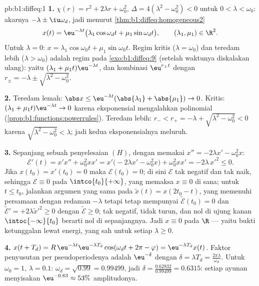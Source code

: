 \begin{solution}{pb:b1:diffeq:1}
\textbf{1.} $\chi(r) = r^2 + 2\lambda r + \omega_0^2$, $\Delta =
4(\lambda^2 - \omega_0^2) < 0$ untuk $0 < \lambda < \omega_0$: akarnya
$-\lambda \pm \iu\omega_d$, jadi menurut
\cref{thm:b1:diffeq:homogeneous2}
\[
x(t) = \eu^{-\lambda t}\bigl(\lambda_1\cos\omega_d t +
\mu_1\sin\omega_d t\bigr), \qquad (\lambda_1, \mu_1) \in \R^2 .
\]
Untuk $\lambda = 0$: $x = \lambda_1\cos\omega_0 t +
\mu_1\sin\omega_0 t$. Regim kritis ($\lambda = \omega_0$) dan
teredam lebih ($\lambda > \omega_0$) adalah regim pada
\cref{exo:b1:diffeq:9} (setelah waktunya diskalakan ulang): yaitu $(\lambda_1 +
\mu_1 t)\eu^{-\lambda t}$, dan kombinasi $\eu^{r_\pm t}$
dengan $r_\pm = -\lambda \pm \sqrt{\lambda^2 - \omega_0^2}$.

\textbf{2.} Teredam lemah: $\abs x \leq \eu^{-\lambda
t}(\abs{\lambda_1} + \abs{\mu_1}) \to 0$. Kritis: $(\lambda_1 +
\mu_1 t)\eu^{-\lambda t} \to 0$ karena eksponensial mengalahkan
polinomial (\cref{prop:b1:functions:powerrules}). Teredam lebih:
$r_- < r_+ = -\lambda + \sqrt{\lambda^2 - \omega_0^2} < 0$
karena $\sqrt{\lambda^2 - \omega_0^2} < \lambda$; jadi kedua
eksponensialnya meluruh.

\textbf{3.} Sepanjang sebuah penyelesaian $(H)$, dengan memakai $x'' = -2\lambda x' -
\omega_0^2 x$:
\[
\mathcal E'(t) = x'x'' + \omega_0^2 x x'
= x'\bigl(-2\lambda x' - \omega_0^2 x\bigr) + \omega_0^2 xx'
= -2\lambda\,x'^2 \leq 0 .
\]
Jika $x(t_0) = x'(t_0) = 0$ maka $\mathcal E(t_0) = 0$; di sini $\mathcal E$
tak negatif dan tak naik, sehingga $\mathcal E \equiv 0$ pada
$\intco{t_0}{+\infty}$, yang memaksa $x \equiv 0$ di sana; untuk $t \leq
t_0$, jalankan argumen yang sama pada $\tilde x(t) = x(2t_0 - t)$, yang
memenuhi persamaan dengan redaman $-\lambda$ tetapi tetap mempunyai
$\tilde{\mathcal E}(t_0) = 0$ dan $\tilde{\mathcal E}' =
+2\lambda\tilde x'^2 \geq 0$ dengan $\tilde{\mathcal E} \geq 0$;
tak negatif, tidak turun, dan nol di ujung kanan
$\intoc{-\infty}{t_0}$ berarti nol di sepanjangnya. Jadi $x \equiv 0$ pada
$\R$ --- yaitu bukti ketunggalan lewat energi, yang sah untuk setiap $\lambda
\geq 0$.

\textbf{4.} $x(t + T_d) = R\,\eu^{-\lambda t}\eu^{-\lambda
T_d}\cos(\omega_d t + 2\pi - \varphi) = \eu^{-\lambda T_d}x(t)$.
Faktor penyusutan per pseudoperiodenya adalah $\eu^{-\delta}$ dengan
$\delta = \lambda T_d = \frac{2\pi\lambda}{\omega_d}$. Untuk
$\omega_0 = 1$, $\lambda = 0.1$: $\omega_d = \sqrt{0.99} =
0.99499$, jadi $\delta = \frac{0.62832}{0.99499} = 0.6315$: setiap
ayunan menyisakan $\eu^{-0.63} \approx 53\%$ amplitudonya.


\end{solution}
